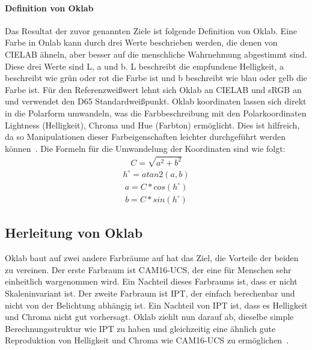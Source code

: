 \documentclass[12pt, a4paper, ngerman]{article}
\begin{document}
\paragraph{Definition von Oklab}
Das Resultat der zuvor genannten Ziele ist folgende Definition von Oklab.
Eine Farbe in Onlab kann durch drei Werte beschrieben werden, die denen von CIELAB ähneln, 
aber besser auf die menschliche Wahrnehmung abgestimmt sind.
Diese drei Werte sind L, a und b. 
L beschreibt die empfundene Helligkeit, a beschreibt wie grün oder rot die Farbe ist und b beschreibt wie blau oder gelb die Farbe ist.
Für den Referenzweißwert lehnt sich Oklab an CIELAB und sRGB an und verwendet den D65 Standardweißpunkt.
Oklab koordinaten lassen sich direkt in die Polarform umwandeln, 
was die Farbbeschreibung mit den Polarkoordinaten Lightness (Helligkeit), Chroma und Hue (Farbton) ermöglicht.
Dies ist hilfreich, da so Manipulationen dieser Farbeigenschaften leichter durchgeführt werden können~\cite{Oklab_2020}.
Die Formeln für die Umwandelung der Koordinaten sind wie folgt:
\begin{equation}
  \begin{aligned}
    C=\sqrt{ a^2 + b^2 }
  \end{aligned}
\end{equation}
\begin{equation}
  \begin{aligned}
    h^\circ = atan2\left( a, b \right)
  \end{aligned}
\end{equation}
\begin{equation}
  \begin{aligned}
    a = C*cos\left( h^\circ \right)
  \end{aligned}
\end{equation}
\begin{equation}
  \begin{aligned}
    b = C*sin\left( h^\circ \right)
  \end{aligned}
\end{equation}


\subsection{Herleitung von Oklab}
Oklab baut auf zwei andere Farbräume auf hat das Ziel, die Vorteile der beiden zu vereinen.
Der erste Farbraum ist \acs{CAM}16-UCS, der eine für Menschen sehr einheitlich wargenommen wird.
Ein Nachteil dieses Farbraums ist, dass er nicht Skaleninvariant ist.
Der zweite Farbraum ist IPT, der einfach berechenbar und nicht von der Belichtung abhängig ist.
Ein Nachteil von IPT ist, dass es Helligkeit und Chroma nicht gut vorhersagt.
Oklab ziehlt nun darauf ab, dieselbe simple Berechnungsstruktur wie IPT zu haben und 
gleichzeitig eine ähnlich gute Reproduktion von Helligkeit und Chroma wie CAM16-UCS zu ermöglichen~\cite{Oklab_2020}.
\end{document}
